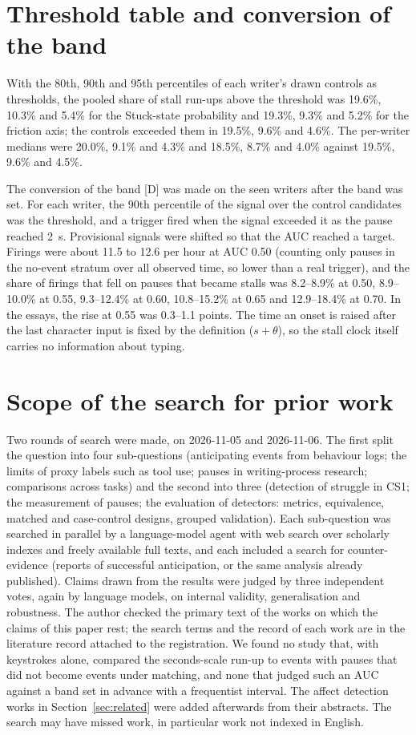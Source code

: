 \section{Threshold table and conversion of the band}
\label{app:threshold}

With the 80th, 90th and 95th percentiles of each writer's drawn controls as thresholds, the pooled share of stall
run-ups above the threshold was 19.6\%, 10.3\% and 5.4\% for the Stuck-state probability and 19.3\%, 9.3\% and 5.2\% for
the friction axis; the controls exceeded them in 19.5\%, 9.6\% and 4.6\%. The per-writer medians were 20.0\%, 9.1\% and
4.3\% and 18.5\%, 8.7\% and 4.0\% against 19.5\%, 9.6\% and 4.5\%.

The conversion of the band [D] was made on the seen writers after the band was set. For each writer, the 90th percentile
of the signal over the control candidates was the threshold, and a trigger fired when the signal exceeded it as the pause
reached 2~s. Provisional signals were shifted so that the AUC reached a target. Firings were about 11.5 to 12.6 per hour
at AUC 0.50 (counting only pauses in the no-event stratum over all observed time, so lower than a real trigger), and the
share of firings that fell on pauses that became stalls was 8.2--8.9\% at 0.50, 8.9--10.0\% at 0.55, 9.3--12.4\% at
0.60, 10.8--15.2\% at 0.65 and 12.9--18.4\% at 0.70. In the essays, the rise at 0.55 was 0.3--1.1 points. The time an
onset is raised after the last character input is fixed by the definition ($s + \theta$), so the stall clock itself
carries no information about typing.

\section{Scope of the search for prior work}
\label{app:novelty}

Two rounds of search were made, on 2026-11-05 and 2026-11-06. The first split the question into four sub-questions
(anticipating events from behaviour logs; the limits of proxy labels such as tool use; pauses in writing-process
research; comparisons across tasks) and the second into three (detection of struggle in CS1; the measurement of pauses;
the evaluation of detectors: metrics, equivalence, matched and case-control designs, grouped validation). Each
sub-question was searched in parallel by a language-model agent with web search over scholarly indexes and freely
available full texts, and each included a search for counter-evidence (reports of successful anticipation, or the same
analysis already published). Claims drawn from the results were judged by three independent votes, again by language
models, on internal validity, generalisation and robustness. The author checked the primary text of the works on which
the claims of this paper rest; the search terms and the record of each work are in the literature record attached to the
registration. We found no study that, with keystrokes alone, compared the seconds-scale run-up to events with pauses that
did not become events under matching, and none that judged such an AUC against a band set in advance with a frequentist
interval. The affect detection works in Section~\ref{sec:related} were added afterwards from their abstracts. The search
may have missed work, in particular work not indexed in English.
